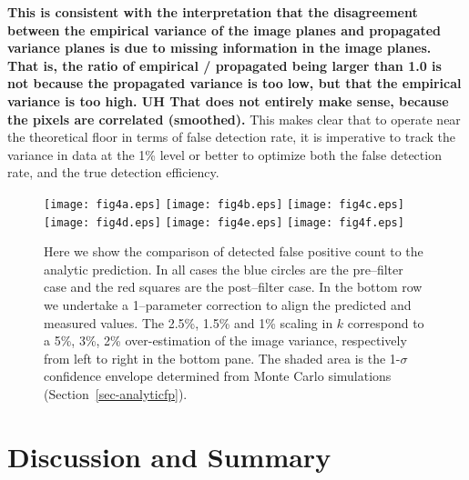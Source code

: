 \documentclass[iop]{emulateapj}
\begin{document}
{\bf This is consistent with the interpretation that the disagreement between the empirical variance of the image planes and propagated variance planes is due to missing information in the image planes.
That is, the ratio of empirical / propagated being larger than 1.0 is not because the propagated variance is too low, but that the empirical variance is too high.
UH That does not entirely make sense, because the pixels are correlated (smoothed).}
This makes clear that to operate near the theoretical floor in terms of false detection rate, it is imperative to track the variance in data at the 1\% level or better to optimize both the false detection rate, and the true detection efficiency.
\begin{figure*}[!ht]
  \centering
  \texttt{[image: fig4a.eps]}
  \texttt{[image: fig4b.eps]}
  \texttt{[image: fig4c.eps]} \\
  \texttt{[image: fig4d.eps]}
  \texttt{[image: fig4e.eps]}
  \texttt{[image: fig4f.eps]} \\
  \caption{Here we show the comparison of detected false positive count to the analytic prediction.
    In all cases the blue circles are the pre--filter case and the red squares are the post--filter case.
    In the bottom row we undertake a 1--parameter correction to align the predicted and measured values.
    The 2.5\%, 1.5\% and 1\% scaling in $k$ correspond to a 5\%, 3\%, 2\% over-estimation of the image variance, respectively from left to right in the bottom pane. 
    The shaded area is the 1-$\sigma$ confidence envelope determined from Monte Carlo simulations (Section~\ref{sec-analyticfp}).}
\label{fig:4}
\end{figure*}

\section{Discussion and Summary}

\end{document}
